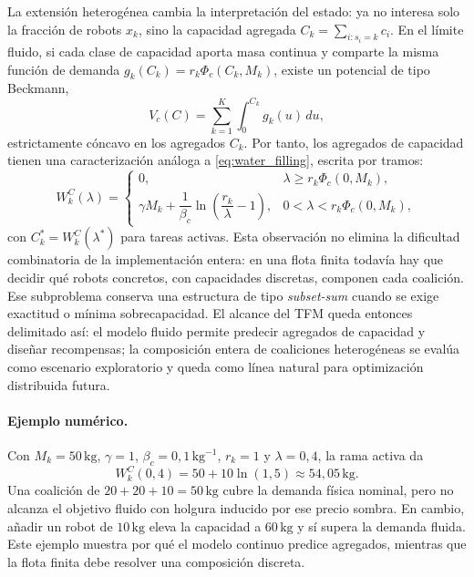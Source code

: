 La extensión heterogénea cambia la interpretación del estado: ya no interesa solo la
fracción de robots $x_k$, sino la capacidad agregada
$C_k=\sum_{i:s_i=k}c_i$. En el límite fluido, si cada clase de capacidad aporta masa
continua y comparte la misma función de demanda $g_k(C_k)=r_k\Phi_c(C_k,M_k)$, existe
un potencial de tipo Beckmann,
\begin{equation}
  V_c(C)=\sum_{k=1}^K\int_0^{C_k}g_k(u)\,du,
  \label{eq:potencial_capacidad}
\end{equation}
estrictamente cóncavo en los agregados $C_k$. Por tanto, los agregados de capacidad
tienen una caracterización análoga a \eqref{eq:water_filling}, escrita por tramos:
\begin{equation}
  W_k^C(\lambda)=
  \begin{cases}
  0,
  & \lambda\ge r_k\Phi_c(0,M_k),\\[4pt]
  \gamma M_k+\dfrac{1}{\beta_c}
    \ln\!\left(\dfrac{r_k}{\lambda}-1\right),
  & 0<\lambda<r_k\Phi_c(0,M_k),
  \end{cases}
  \label{eq:water_capacity}
\end{equation}
con $C_k^*=W_k^C(\lambda^*)$ para tareas activas.
Esta observación no elimina la dificultad combinatoria de la implementación entera:
en una flota finita todavía hay que decidir qué robots concretos, con capacidades
discretas, componen cada coalición. Ese subproblema conserva una estructura de tipo
\emph{subset-sum} cuando se exige exactitud o mínima sobrecapacidad. El alcance del TFM
queda entonces delimitado así: el modelo fluido permite predecir agregados de capacidad
y diseñar recompensas; la composición entera de coaliciones heterogéneas se evalúa como
escenario exploratorio y queda como línea natural para optimización distribuida futura.

\paragraph{Ejemplo numérico.}
Con $M_k=50\,\mathrm{kg}$, $\gamma=1$, $\beta_c=0{,}1\,\mathrm{kg}^{-1}$, $r_k=1$ y
$\lambda=0{,}4$, la rama activa da
\[
  W_k^C(0{,}4)=50+10\ln(1{,}5)\approx54{,}05\,\mathrm{kg}.
\]
Una coalición de $20+20+10=50\,\mathrm{kg}$ cubre la demanda física nominal, pero no
alcanza el objetivo fluido con holgura inducido por ese precio sombra. En cambio,
añadir un robot de $10\,\mathrm{kg}$ eleva la capacidad a $60\,\mathrm{kg}$ y sí supera
la demanda fluida. Este ejemplo muestra por qué el modelo continuo predice agregados,
mientras que la flota finita debe resolver una composición discreta.
